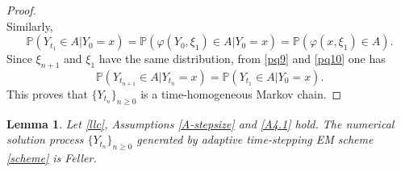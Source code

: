 \documentclass[preprint,12pt,compress]{elsarticle}
\newtheorem{lemma}[theorem]{Lemma}%
\begin{document}
\begin{proof}
\begin{equation}
\end{equation}
Similarly,
\begin{equation}  \label{pq10}
	\mathbb{P}\left( {{Y_{{t_1}}} \in A|{Y_0} = x } \right) = \mathbb{P}\left( {\varphi ({Y_{{0}}},{\xi _1}) \in A|{Y_0} = x } \right) = \mathbb{P}\left( {\varphi (x ,{\xi _1}) \in A} \right) .
\end{equation}
Since $\xi_{n + 1}$ and $\xi_1$ have the same distribution, from \eqref{pq9} and \eqref{pq10} one has
\begin{equation*}
	\mathbb{P}\left( {{Y_{{t_{n + 1}}}} \in A|{Y_{{t_n}}} = x } \right) = \mathbb{P}\left( {{Y_{{t_1}}} \in A|{Y_0} = x } \right).
\end{equation*}
This proves that $\{Y_{t_n}\}_{n\ge 0}$ is a time-homogeneous Markov chain.
\end{proof}

\begin{lemma} \label{feller} 
	Let \eqref{llc}, Assumptions \ref{A-stepsize} and \ref{A4.1} hold. The numerical solution process ${\{ {Y_{{t_n}}}\} _{n \ge 0}}$ generated by adaptive time-stepping EM scheme \eqref{scheme} is Feller.
\end{lemma}
\end{document}
